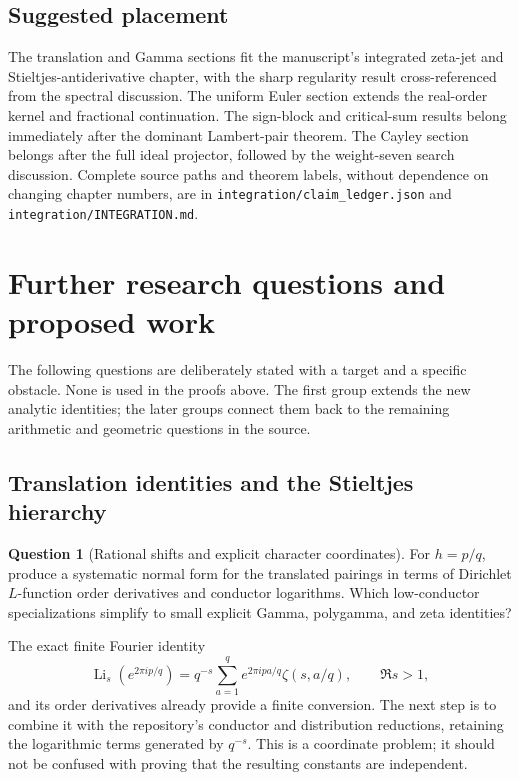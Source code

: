 \documentclass[11pt,a4paper]{article}
\numberwithin{equation}{section}
\theoremstyle{definition}
\newtheorem{question}[theorem]{Question}
\theoremstyle{remark}
\DeclareMathOperator{\Li}{Li}
\begin{document}
\subsection{Suggested placement}

The translation and Gamma sections fit the manuscript's integrated
zeta-jet and Stieltjes-antiderivative chapter, with the sharp regularity
result cross-referenced from the spectral discussion. The uniform Euler
section extends the real-order kernel and fractional continuation.
The sign-block and critical-sum results belong immediately after the
dominant Lambert-pair theorem. The Cayley section belongs after the full
ideal projector, followed by the weight-seven search discussion.
Complete source paths and theorem labels, without dependence on changing
chapter numbers, are in \texttt{integration/claim\_ledger.json} and
\texttt{integration/INTEGRATION.md}.

\section{Further research questions and proposed work}
\label{sec:questions}

The following questions are deliberately stated with a target and a
specific obstacle. None is used in the proofs above. The first group
extends the new analytic identities; the later groups connect them back
to the remaining arithmetic and geometric questions in the source.

\subsection{Translation identities and the Stieltjes hierarchy}

\begin{question}[Rational shifts and explicit character coordinates]
For $h=p/q$, produce a systematic normal form for the translated
pairings in terms of Dirichlet $L$-function order derivatives and
conductor logarithms. Which low-conductor specializations simplify
to small explicit Gamma, polygamma, and zeta identities?
\end{question}
The exact finite Fourier identity
\[
 \Li_s(e^{2\pi ip/q})=q^{-s}\sum_{a=1}^q
 e^{2\pi ipa/q}\zeta(s,a/q),\qquad \Re s>1,
\]
and its order derivatives already provide a finite conversion.
The next step is to combine it with the repository's conductor and
distribution reductions, retaining the logarithmic terms generated
by $q^{-s}$. This is a coordinate problem; it should not be confused
with proving that the resulting constants are independent.
\end{document}
